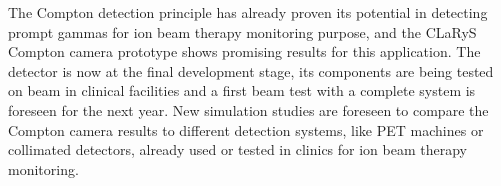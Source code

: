 The Compton detection principle has already proven its potential in detecting prompt gammas for ion beam therapy monitoring purpose, and the CLaRyS Compton camera prototype shows promising results for this application. The detector is now at the final development stage, its components are being tested on beam in clinical facilities and a first beam test with a complete system is foreseen for the next year. New simulation studies are foreseen to compare the Compton camera results to different detection systems, like PET machines or collimated detectors, already used or tested in clinics for ion beam therapy monitoring.            


